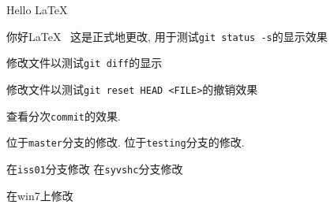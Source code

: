 \documentclass{ctexart}
\begin{document}
    Hello \LaTeX~

    你好\LaTeX~ %
    这是正式地更改, 用于测试\verb|git status -s|的显示效果

    修改文件以测试\verb|git diff|的显示

    修改文件以测试\verb|git reset HEAD <FILE>|的撤销效果

    查看分次\verb|commit|的效果. 

    位于\verb|master|分支的修改. 
    位于\verb|testing|分支的修改. 
    
    在\verb|iss01|分支修改
    在\verb|syvshc|分支修改

    在win7上修改
\end{document}
